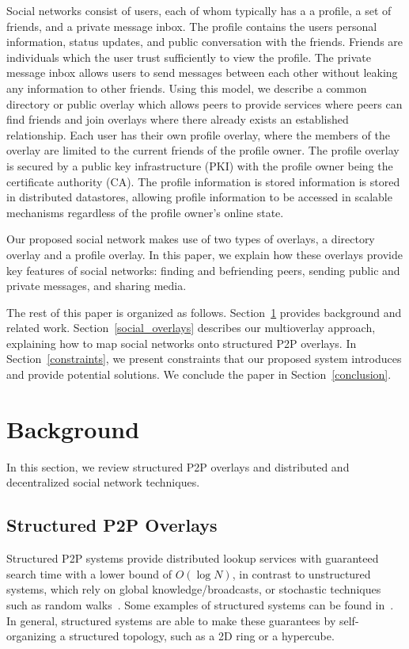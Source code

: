 \documentclass[letterpaper,twocolumn,10pt]{article}
\begin{document}
Social networks consist of users, each of whom typically has a a profile, a set
of friends, and a private message inbox.  The profile contains the users
personal information, status updates, and public conversation with the friends.
Friends are individuals which the user trust sufficiently to view the profile.
The private message inbox allows users to send messages between each other
without leaking any information to other friends.  Using this model, we
describe a common directory or public overlay which allows peers to provide
services where peers can find friends and join overlays where there already
exists an established relationship.  Each user has their own profile overlay,
where the members of the overlay are limited to the current friends of the
profile owner.  The profile overlay is secured by a public key infrastructure
(PKI) with the profile owner being the certificate authority (CA).  The profile
information is stored information is stored in distributed datastores, allowing
profile information to be accessed in scalable mechanisms regardless of the
profile owner's online state.

Our proposed social network makes use of two types of overlays, a directory
overlay and a profile overlay.  In this paper, we explain how these overlays
provide key features of social networks:  finding and befriending peers,
sending public and private messages, and sharing media.

The rest of this paper is organized as follows.  Section~\ref{background}
provides background and related work.  Section~\ref{social_overlays} describes
our multioverlay approach, explaining how to map social networks onto structured
P2P overlays.  In Section~\ref{constraints}, we present constraints that our
proposed system introduces and provide potential solutions.  We conclude the
paper in Section~\ref{conclusion}.

\section{Background}
\label{background}
In this section, we review structured P2P overlays and distributed and
decentralized social network techniques.
\subsection{Structured P2P Overlays}
Structured P2P systems provide distributed lookup services with guaranteed
search time with a lower bound of $O(\log N)$, in contrast to unstructured
systems, which rely on global knowledge/broadcasts, or stochastic techniques
such as random walks~\cite{unstructured_v_structured}.  Some examples of
structured systems can be found in~\cite{pastry, chord, symphony, kademlia,
can}.  In general, structured systems are able to make these guarantees by
self-organizing a structured topology, such as a 2D ring or a hypercube.
\end{document}

